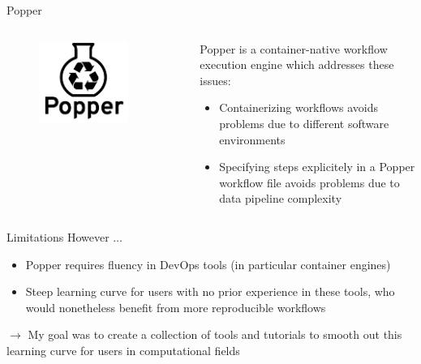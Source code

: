 \documentclass[10pt]{beamer}
\begin{document}
\begin{frame}{Popper}
    \begin{columns}
        \begin{column}{0.5\textwidth}  %
            \begin{center}
                \begin{figure}
                    \includegraphics[width=0.8\textwidth]{images/popper_logo.png}
                \end{figure}
            \end{center}
        \end{column}
        \begin{column}{0.5\textwidth}
            Popper is a container-native workflow execution engine
            which addresses these issues:
            \begin{itemize}
                \item Containerizing workflows avoids problems due to different 
                software environments
                \item Specifying steps explicitely in a Popper workflow file avoids problems due to data pipeline complexity
            \end{itemize}
        \end{column}
    \end{columns}

\end{frame}

\begin{frame}{Limitations}
    However $\ldots$
    \begin{itemize}
        \item  Popper requires fluency in DevOps tools (in particular
        container engines)
        \item Steep learning curve for users with no prior experience in these tools, who would nonetheless benefit from more reproducible workflows
    \end{itemize}
    $\rightarrow$ My goal was to create a collection of tools and tutorials
    to smooth out this learning curve for users in computational fields 
\end{frame}
\end{document}
